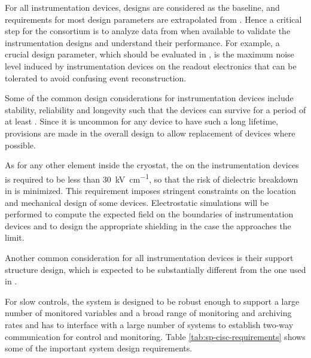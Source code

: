 
For all \lar instrumentation devices,  designs are
considered as the baseline, and requirements for most design
parameters are extrapolated from . Hence a critical step for
the  consortium is to analyze data from  when available
to validate the instrumentation designs and understand their
performance. For example, a crucial design parameter, which should be evaluated in ,
is the maximum noise level induced by instrumentation devices on the readout electronics that can be tolerated to avoid confusing event reconstruction. 

Some of the common design considerations for
instrumentation devices include stability, reliability and longevity
such that the devices can survive for a period of at least %
\dunelifetime{}.  Since it is uncommon for any device
to have such a long lifetime, provisions are made in the overall
design to allow replacement of devices where possible.

As for any other element inside the cryostat, 
the \efield on the instrumentation devices is 
required to be less than \SI{30}{kV\per\cm},
so that the risk of dielectric breakdown in \lar is minimized.
This requirement imposes stringent constraints on the location and mechanical 
design of some devices. Electrostatic simulations 
will be performed to compute the expected field on the boundaries of 
instrumentation devices and to design the appropriate \efield shielding
in the case the \efield approaches the limit. 

Another common consideration for all instrumentation devices is their support structure
design, which is expected to be substantially different from the one used in .

For slow controls, the system %
is designed to be robust enough to support a large number of monitored variables and a broad range of
monitoring and archiving rates and has %
to interface
with a large number of systems to establish two-way communication for
control and monitoring. Table \ref{tab:sp-cisc-requirements} shows
some of the important  system design requirements.


